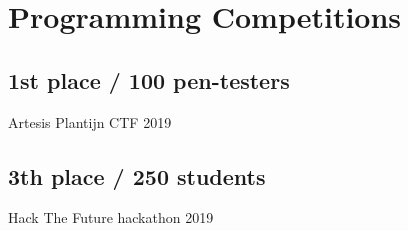 \section{Programming Competiti\textcolor{mycolor}{ons}}
  \subsection{1st place / 100 pen-testers}
    Artesis Plantijn CTF
    {\textcolor{mygrey}{\hspace*{\fill}2019}}
  \subsection{3th place / 250 students}
    Hack The Future hackathon
    {\textcolor{mygrey}{\hspace*{\fill}2019}}
  
